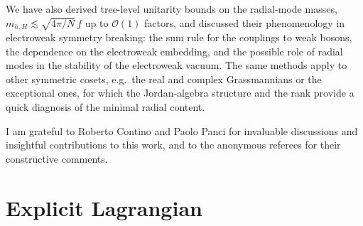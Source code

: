 \documentclass[aps,prd,twocolumn,superscriptaddress,nofootinbib,floatfix]{revtex4-2}
\theoremstyle{remark}
\newcommand{\eg}{e.g.}
\begin{document}
We have also derived tree-level unitarity bounds on the radial-mode masses, $m_{h,H}\lesssim\sqrt{4\pi/N}\,f$ up to $\mathcal{O}(1)$ factors, and discussed their phenomenology in electroweak symmetry breaking: the sum rule for the couplings to weak bosons, the dependence on the electroweak embedding, and the possible role of radial modes in the stability of the electroweak vacuum. The same methods apply to other symmetric cosets, \eg\ the real and complex Grassmannians or the exceptional ones, for which the Jordan-algebra structure and the rank provide a quick diagnosis of the minimal radial content.

\begin{acknowledgments}
I am grateful to Roberto Contino and Paolo Panci for invaluable discussions and insightful contributions to this work, and to the anonymous referees for their constructive comments.
\end{acknowledgments}

\appendix
\section{Explicit Lagrangian}
\label{app:lagrangian}
\end{document}
